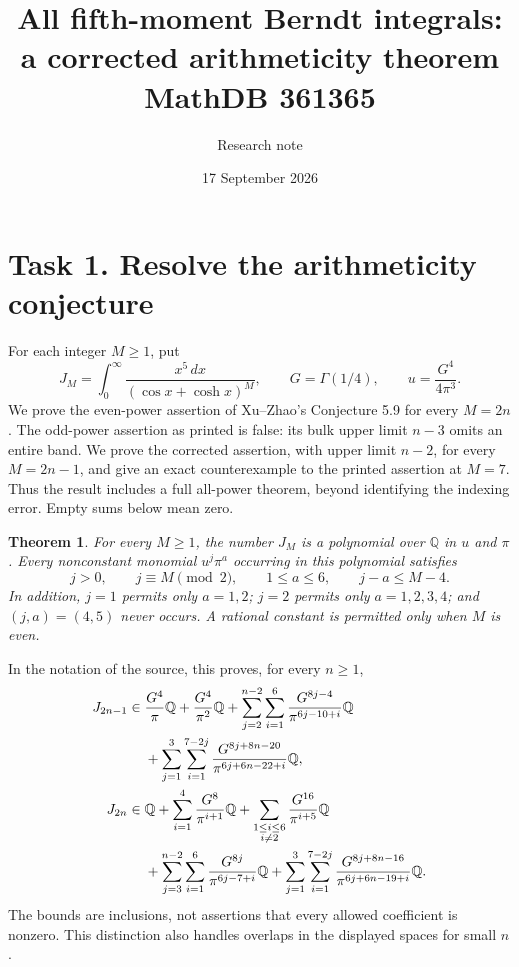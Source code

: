 \documentclass[11pt]{article}
\title{All fifth-moment Berndt integrals:\\a corrected arithmeticity theorem\\MathDB 361365}
\author{Research note}
\date{17 September 2026}
\newcommand{\Q}{\mathbb Q}
\newtheorem{theorem}{Theorem}
\begin{document}
\maketitle

\section*{Task 1. Resolve the arithmeticity conjecture}
For each integer $M\ge1$, put
\[
 J_M=\int_0^\infty\frac{x^5\,dx}{(\cos x+\cosh x)^M},\qquad
 G=\Gamma(1/4),\qquad u=\frac{G^4}{4\pi^3}.
\]
We prove the even-power assertion of Xu--Zhao's Conjecture 5.9
\cite[p.~27]{XZ} for every $M=2n$. The odd-power assertion as printed
is false: its bulk upper limit $n-3$ omits an entire band. We prove
the corrected assertion, with upper limit $n-2$, for every $M=2n-1$,
and give an exact counterexample to the printed assertion at $M=7$.
Thus the result includes a full all-power theorem, beyond identifying
the indexing error. Empty sums below mean zero.

\begin{theorem}\label{support}
For every $M\ge1$, the number $J_M$ is a polynomial over $\Q$ in
$u$ and $\pi$. Every nonconstant monomial $u^j\pi^a$ occurring in
this polynomial satisfies
\begin{equation}\label{bounds}
 j>0,\qquad j\equiv M\pmod2,\qquad 1\le a\le6,
 \qquad j-a\le M-4.
\end{equation}
In addition, $j=1$ permits only $a=1,2$; $j=2$ permits only
$a=1,2,3,4$; and $(j,a)=(4,5)$ never occurs. A rational constant
is permitted only when $M$ is even.
\end{theorem}

In the notation of the source, this proves, for every $n\ge1$,
\begin{align}
 J_{2n-1}\in{}&\frac{G^4}{\pi}\Q+\frac{G^4}{\pi^2}\Q
 +\sum_{j=2}^{n-2}\sum_{i=1}^{6}
       \frac{G^{8j-4}}{\pi^{6j-10+i}}\Q\notag\\
 &+\sum_{j=1}^{3}\sum_{i=1}^{7-2j}
       \frac{G^{8j+8n-20}}{\pi^{6j+6n-22+i}}\Q,\label{odd-result}\\
 J_{2n}\in{}&\Q+\sum_{i=1}^{4}\frac{G^8}{\pi^{i+1}}\Q
 +\sum_{\substack{1\le i\le6\\i\ne2}}
       \frac{G^{16}}{\pi^{i+5}}\Q\notag\\
 &+\sum_{j=3}^{n-2}\sum_{i=1}^{6}
       \frac{G^{8j}}{\pi^{6j-7+i}}\Q
 +\sum_{j=1}^{3}\sum_{i=1}^{7-2j}
       \frac{G^{8j+8n-16}}{\pi^{6j+6n-19+i}}\Q.\label{even-result}
\end{align}
The bounds are inclusions, not assertions that every allowed
coefficient is nonzero. This distinction also handles overlaps in
the displayed spaces for small $n$.
\end{document}
